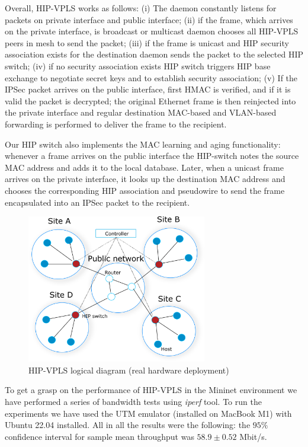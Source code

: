Overall, HIP-VPLS works as follows: (i) The daemon constantly listens for packets on private interface 
and public interface; (ii) if the frame, which arrives on the private interface, is broadcast or multicast 
daemon chooses all HIP-VPLS peers in mesh to send the packet; 
(iii) if the frame is unicast and HIP security association exists for the destination daemon 
sends the packet to the selected HIP switch; (iv) if no security association exists HIP switch triggers 
HIP base exchange to negotiate secret keys and to establish security association; (v) If the 
IPSec packet arrives on the public interface, first HMAC is verified, and if it is valid the packet 
is decrypted; the original Ethernet frame is then reinjected into the private interface and 
regular destination MAC-based and VLAN-based forwarding is performed to deliver the frame to the recipient. 

Our HIP switch also implements the MAC learning and aging functionality: whenever a frame arrives 
on the public interface the HIP-switch notes the source MAC address 
and adds it to the local database. Later, when a unicast frame arrives on the private interface, 
it looks up the destination MAC address and chooses the corresponding HIP association and pseudowire to send
the frame encapsulated into an IPSec packet to the recipient. 


\begin{figure}[h!]
    \centering
    \includegraphics[width=0.7\textwidth]{graphics/hw-hipls.png}
    \caption{HIP-VPLS logical diagram (real hardware deployment)}
    \label{fig:mininet}
\end{figure}

To get a grasp on the performance of HIP-VPLS in the Mininet environment we 
have performed a series of bandwidth tests using {\it iperf} tool. To run
the experiments we have used the UTM emulator (installed on MacBook M1) 
with Ubuntu 22.04 installed. All in all the results were the following: 
the $95\%$ confidence interval for sample mean throughput was 
$58.9 \pm 0.52$ Mbit/s.

